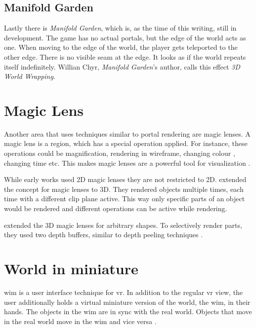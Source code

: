 \subsection{Manifold Garden}
Lastly there is \textit{Manifold Garden}, which is, as the time of this writing, still in development. The game has no actual portals, but the edge of the world acts as one. When moving to the edge of the world, the player gets teleported to the other edge. There is no visible seam at the edge. It looks as if the world repeats itself indefinitely. Willian Chyr, \textit{Manifold Garden}'s author, calls this effect \textit{3D World Wrapping}.




\section{Magic Lens}
Another area that uses techniques similar to portal rendering are magic lenses. A magic lens is a region, which has a special operation applied. For instance, these operations could be magnification, rendering in wireframe, changing colour \cite{bier:1993:toolglass}, changing time \cite{ryall:2005:temporal, tiesel:2009:composable} etc. This makes magic lenses are a powerful tool for visualization \cite{bier:1993:toolglass, tominski:2014:survey}.

While early works used 2D magic lenses \cite{bier:1993:toolglass} they are not restricted to 2D. \textcite{viega:1996:3d} extended the concept for magic lenses to 3D. They rendered objects multiple times, each time with a different clip plane active. This way only specific parts of an object would be rendered and different operations can be active while rendering.

\textcite{ropinski:2004:real} extended the 3D magic lenses for arbitrary shapes. To selectively render parts, they used two depth buffers, similar to depth peeling techniques \cite{everitt:2001:interactive}.

\section{World in miniature}
\Gls{wim} is a user interface technique for \gls{vr}. In addition to the regular \gls{vr} view, the user additionally holds a virtual miniature version of the world, the \gls{wim}, in their hands. The objects in the \gls{wim} are in sync with the real world. Objects that move in the real world move in the \gls{wim} and vice versa \cite{stoakley:1995:virtual}. 


